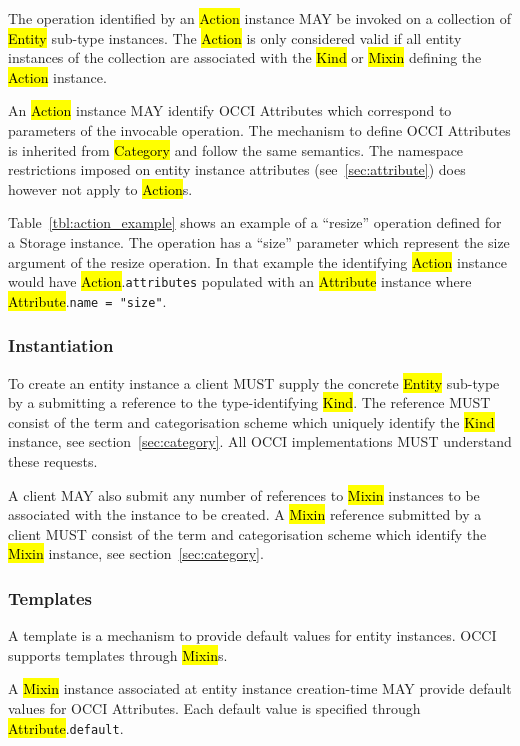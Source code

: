 \documentclass[10pt,a4paper]{article}
\begin{document}
The operation identified by an \hl{Action} instance MAY be invoked on a
collection of \hl{Entity} sub-type
instances. The \hl{Action} is only considered valid if all entity
instances of the collection are associated with the \hl{Kind} or
\hl{Mixin} defining the \hl{Action} instance.

An \hl{Action} instance MAY identify OCCI Attributes which correspond to
parameters of the invocable operation.
The mechanism to define OCCI Attributes is inherited from \hl{Category}
and follow the same semantics.
The namespace restrictions imposed on entity instance attributes
(see~\ref{sec:attribute}) does however not apply to \hl{Action}s.

Table~\ref{tbl:action_example} shows an example of a ``resize'' operation
defined for a Storage
instance. The operation has a ``size'' parameter which represent the size
argument of the resize operation. In that example the identifying
\hl{Action} instance would have \hl{Action}.{\tt attributes} populated
with an \hl{Attribute} instance where \hl{Attribute}.{\tt name = "size"}.


\subsubsection{Instantiation}
\label{sec:instantiation}
To create an entity instance a client MUST supply the concrete
\hl{Entity} sub-type by a submitting a reference to the
type-identifying \hl{Kind}.  The reference MUST consist of the term
and categorisation scheme which uniquely identify the \hl{Kind}
instance, see section~\ref{sec:category}.  All OCCI implementations
MUST understand these requests.

A client MAY also submit any number of references to \hl{Mixin}
instances to be associated with the instance to be created. A
\hl{Mixin} reference submitted by a client MUST consist of the term
and categorisation scheme which identify the \hl{Mixin} instance, see
section~\ref{sec:category}.

\subsubsection{Templates}
\label{sec:template}

A template is a mechanism to provide default values for entity instances.
OCCI supports templates through \hl{Mixin}s.

A \hl{Mixin} instance associated at entity instance creation-time MAY provide default
values for OCCI Attributes.
Each default value is specified through \hl{Attribute}.{\tt default}.
\end{document}
